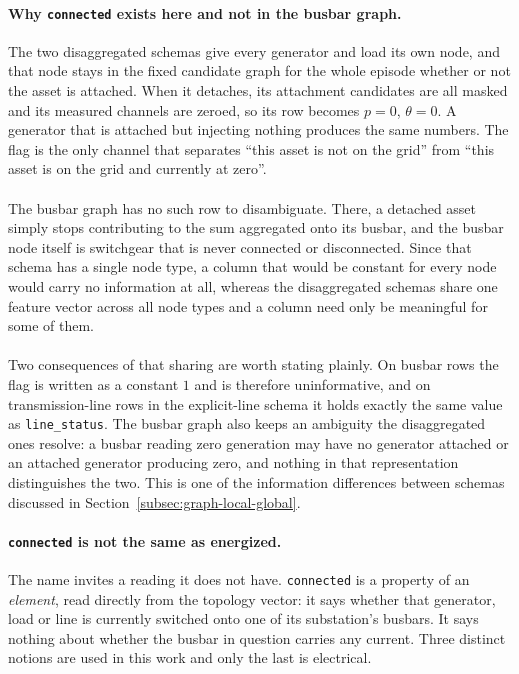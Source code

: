 {\color{clarif}
\paragraph{Why \texttt{connected} exists here and not in the busbar graph.}
The two disaggregated schemas give every generator and load its own node, and
that node stays in the fixed candidate graph for the whole episode whether or
not the asset is attached. When it detaches, its attachment candidates are all
masked and its measured channels are zeroed, so its row becomes
$p=0$, $\theta=0$. A generator that is attached but injecting nothing produces
the same numbers. The flag is the only channel that separates ``this asset is
not on the grid'' from ``this asset is on the grid and currently at zero''.
\\
\\
The busbar graph has no such row to disambiguate. There, a detached asset simply
stops contributing to the sum aggregated onto its busbar, and the busbar node
itself is switchgear that is never connected or disconnected. Since that schema
has a single node type, a column that would be constant for every node would
carry no information at all, whereas the disaggregated schemas share one feature
vector across all node types and a column need only be meaningful for some of
them.
\\
\\
Two consequences of that sharing are worth stating plainly. On busbar rows the
flag is written as a constant $1$ and is therefore uninformative, and on
transmission-line rows in the explicit-line schema it holds exactly the same
value as \texttt{line\_status}. The busbar graph also keeps an ambiguity the
disaggregated ones resolve: a busbar reading zero generation may have no
generator attached or an attached generator producing zero, and nothing in that
representation distinguishes the two. This is one of the information differences
between schemas discussed in Section~\ref{subsec:graph-local-global}.

\paragraph{\texttt{connected} is not the same as energized.}
The name invites a reading it does not have. \texttt{connected} is a property of
an \emph{element}, read directly from the topology vector: it says whether that
generator, load or line is currently switched onto one of its substation's
busbars. It says nothing about whether the busbar in question carries any
current. Three distinct notions are used in this work and only the last is
electrical.

}
